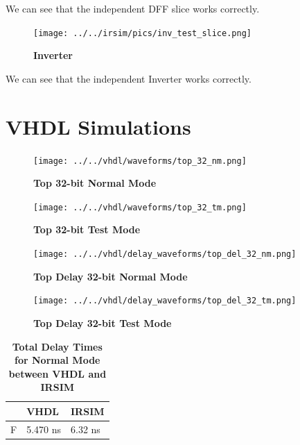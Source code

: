 \documentclass[a4paper]{article}
\begin{document}
    We can see that the independent DFF slice works correctly.

    \begin{figure}[H]
        \centering
        \texttt{[image: ../../irsim/pics/inv\_test\_slice.png]}
        \caption{\textbf{Inverter}}
        \label{fig:gg}
    \end{figure}

    We can see that the independent Inverter works correctly.

\section{\textbf{VHDL Simulations}}
    \begin{figure}[H]
        \centering
        \texttt{[image: ../../vhdl/waveforms/top\_32\_nm.png]}
        \caption{\textbf{Top 32-bit Normal Mode}}
        \label{fig:gg}
    \end{figure}

    \begin{figure}[H]
        \centering
        \texttt{[image: ../../vhdl/waveforms/top\_32\_tm.png]}
        \caption{\textbf{Top 32-bit Test Mode}}
        \label{fig:gg}
    \end{figure}

    \begin{figure}[H]
        \centering
        \texttt{[image: ../../vhdl/delay\_waveforms/top\_del\_32\_nm.png]}
        \caption{\textbf{Top Delay 32-bit Normal Mode}}
        \label{fig:gg}
    \end{figure}

    \begin{figure}[H]
        \centering
        \texttt{[image: ../../vhdl/delay\_waveforms/top\_del\_32\_tm.png]}
        \caption{\textbf{Top Delay 32-bit Test Mode}}
        \label{fig:gg}
    \end{figure}

    \begin{table}[H]
        \centering
        \begin{tabular}{l | l | l }
            \hline
               & \textbf{VHDL} & \textbf{IRSIM} \\ \hline
            \midrule
                F           & 5.470 ns & 6.32 ns\\
        \end{tabular}
        \caption{\textbf{Total Delay Times for Normal Mode between VHDL and IRSIM}}
    \end{table}
\end{document}
